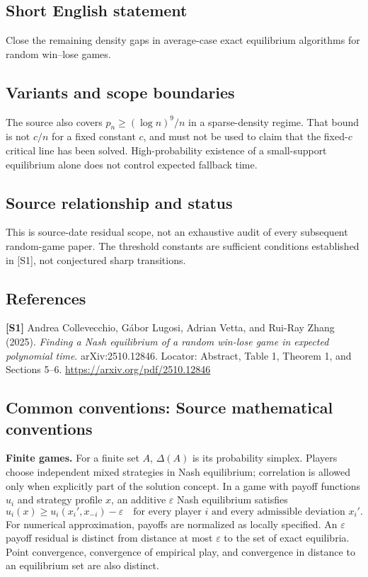 \documentclass[11pt,a4paper]{article}
\begin{document}
\subsection*{Short English statement}
Close the remaining density gaps in average-case exact equilibrium algorithms for random win--lose games.
\subsection*{Variants and scope boundaries}
The source also covers $p_n\geq(\log n)^9/n$ in a sparse-density regime. That bound is not $c/n$ for a fixed constant $c$, and must not be used to claim that the fixed-$c$ critical line has been solved. High-probability existence of a small-support equilibrium alone does not control expected fallback time.
\subsection*{Source relationship and status}
This is source-date residual scope, not an exhaustive audit of every subsequent random-game paper. The threshold constants are sufficient conditions established in [S1], not conjectured sharp transitions.
\subsection*{References}
\begingroup\footnotesize\raggedright
{\footnotesize\raggedright
\textbf{[S1]} Andrea Collevecchio, G\'abor Lugosi, Adrian Vetta, and Rui-Ray Zhang (2025). \emph{Finding a Nash equilibrium of a random win-lose game in expected polynomial time}. arXiv:2510.12846. Locator: Abstract, Table 1, Theorem 1, and Sections 5--6. \url{https://arxiv.org/pdf/2510.12846}\par}
\par\endgroup

\subsection*{Common conventions: Source mathematical conventions}

\textbf{Finite games.} For a finite set $A$, $\Delta(A)$ is its probability
simplex. Players choose independent mixed strategies in Nash equilibrium;
correlation is allowed only when explicitly part of the solution concept.
In a game with payoff functions $u_i$ and strategy profile $x$, an additive
$\varepsilon$ Nash equilibrium satisfies
\[
 u_i(x)\geq u_i(x_i',x_{-i})-\varepsilon
 \quad\text{for every player $i$ and every admissible deviation $x_i'$}.
\]
For numerical approximation, payoffs are normalized as locally specified.
An $\varepsilon$ payoff residual is distinct from distance at most
$\varepsilon$ to the set of exact equilibria. Point convergence, convergence
of empirical play, and convergence in distance to an equilibrium set are
also distinct.
\end{document}

